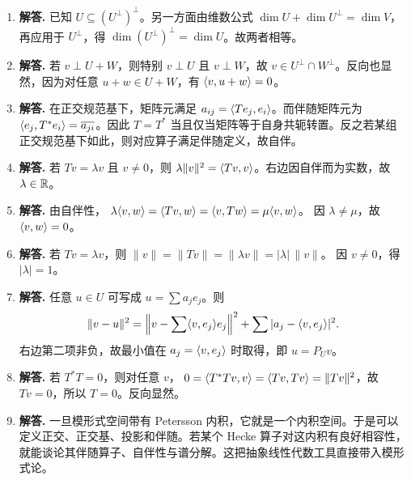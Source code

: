 \begin{enumerate}[label=\textbf{\arabic*.}, leftmargin=*, itemsep=1em]
\item \textbf{解答.} 已知 $U\subseteq (U^{\perp})^{\perp}$。另一方面由维数公式
$\dim U+\dim U^{\perp}=\dim V$，再应用于 $U^{\perp}$，得
$\dim (U^{\perp})^{\perp}=\dim U$。故两者相等。
\item \textbf{解答.} 若 $v\perp U+W$，则特别 $v\perp U$ 且 $v\perp W$，故 $v\in U^{\perp}\cap W^{\perp}$。反向也显然，因为对任意 $u+w\in U+W$，有 $\langle v, u+w \rangle=0$。
\item \textbf{解答.} 在正交规范基下，矩阵元满足 $a_{ij}=\langle Te_j, e_i \rangle$。而伴随矩阵元为 $\langle e_j, T^*e_i \rangle=\overline{a_{ji}}$。因此 $T=T^*$ 当且仅当矩阵等于自身共轭转置。反之若某组正交规范基下如此，则对应算子满足伴随定义，故自伴。
\item \textbf{解答.} 若 $Tv=\lambda v$ 且 $v\neq0$，则
$\lambda\|v\|^2=\langle Tv, v \rangle$。右边因自伴而为实数，故 $\lambda\in\mathbb{R}$。
\item \textbf{解答.} 由自伴性，
$\lambda\langle v, w \rangle=\langle Tv, w \rangle=\langle v, Tw \rangle=\mu\langle v, w \rangle$。
因 $\lambda\neq\mu$，故 $\langle v, w \rangle=0$。
\item \textbf{解答.} 若 $Tv=\lambda v$，则
$\|v\|=\|Tv\|=\|\lambda v\|=|\lambda|\,\|v\|$。
因 $v\neq0$，得 $|\lambda|=1$。
\item \textbf{解答.} 任意 $u\in U$ 可写成 $u=\sum a_je_j$。则
\[
\|v-u\|^2=\left\|v-\sum\langle v, e_j \rangle e_j\right\|^2+\sum |a_j-\langle v, e_j \rangle|^2.
\]
右边第二项非负，故最小值在 $a_j=\langle v, e_j \rangle$ 时取得，即 $u=P_Uv$。
\item \textbf{解答.} 若 $T^*T=0$，则对任意 $v$，
$0=\langle T^*Tv, v \rangle=\langle Tv, Tv \rangle=\|Tv\|^2$，故 $Tv=0$，所以 $T=0$。反向显然。
\item \textbf{解答.} 一旦模形式空间带有 Petersson 内积，它就是一个内积空间。于是可以定义正交、正交基、投影和伴随。若某个 Hecke 算子对这内积有良好相容性，就能谈论其伴随算子、自伴性与谱分解。这把抽象线性代数工具直接带入模形式论。
\end{enumerate}
